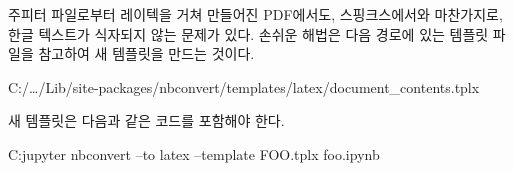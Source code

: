 주피터 파일로부터 레이텍을 거쳐 만들어진 PDF에서도, 스핑크스에서와 마찬가지로, 한글 텍스트가 식자되지 않는 문제가 있다.
손쉬운 해법은 다음 경로에 있는 템플릿 파일을 참고하여 새 템플릿을 만드는 것이다.

\begin{codewrite}
C:/…/Lib/site-packages/nbconvert/templates/latex/document_contents.tplx
\end{codewrite}
\powershellread

새 템플릿은 다음과 같은 코드를 포함해야 한다.

\coderead[language=js+jinja]

\begin{codewrite}
C:\>jupyter nbconvert --to latex --template FOO.tplx foo.ipynb
\end{codewrite}
\powershellread